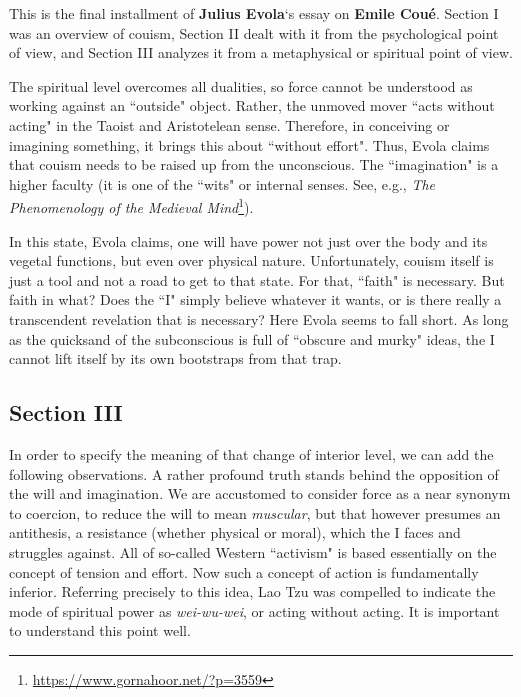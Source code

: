 \hfill

\begin{quotationx}
This is the final installment of \textbf{Julius Evola}`s essay on \textbf{Emile Coué}. Section I was an overview of couism, Section II dealt with it from the psychological point of view, and Section III analyzes it from a metaphysical or spiritual point of view.

The spiritual level overcomes all dualities, so force cannot be understood as working against an ``outside" object. Rather, the unmoved mover ``acts without acting" in the Taoist and Aristotelean sense. Therefore, in conceiving or imagining something, it brings this about ``without effort". Thus, Evola claims that couism needs to be raised up from the unconscious. The ``imagination" is a higher faculty (it is one of the ``wits" or internal senses. See, e.g., \textit{The Phenomenology of the Medieval Mind}\footnote{\url{https://www.gornahoor.net/?p=3559}}).

In this state, Evola claims, one will have power not just over the body and its vegetal functions, but even over physical nature. Unfortunately, couism itself is just a tool and not a road to get to that state. For that, ``faith" is necessary. But faith in what? Does the ``I" simply believe whatever it wants, or is there really a transcendent revelation that is necessary? Here Evola seems to fall short. As long as the quicksand of the subconscious is full of ``obscure and murky" ideas, the I cannot lift itself by its own bootstraps from that trap. 

\end{quotationx}

\subsection*{Section III}
In order to specify the meaning of that change of interior level, we can add the following observations. A rather profound truth stands behind the opposition of the will and imagination. We are accustomed to consider force as a near synonym to coercion, to reduce the will to mean \textit{muscular}, but that however presumes an antithesis, a resistance (whether physical or moral), which the I faces and struggles against. All of so-called Western ``activism" is based essentially on the concept of tension and effort. Now such a concept of action is fundamentally inferior. Referring precisely to this idea, Lao Tzu was compelled to indicate the mode of spiritual power as \textit{wei-wu-wei}, or acting without acting. It is important to understand this point well.

